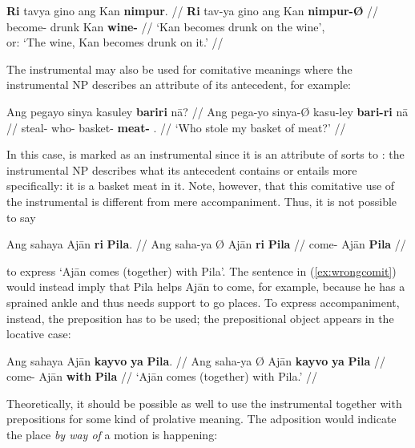 \a\begingl
	\gla \textbf{Ri} tavya gino ang Kan \textbf{nimpur}. //
	\glb \textbf{Ri} tav-ya gino ang Kan \textbf{nimpur-Ø} //
	\glc \textbf{\InsT{}} become-\TsgM{} drunk \Aarg{} Kan 
		\textbf{wine-\Top{}} //
	\glft `Kan becomes drunk on the wine', \\
		or: `The wine, Kan becomes drunk on it.' //
\endgl

\xe

The instrumental may also be used for comitative meanings where the 
instrumental NP describes an attribute of its antecedent, for example:

\ex\begingl
	\gla Ang pegayo sinya kasuley \textbf{bariri} nā? //
	\glb Ang pega-yo sinya-Ø kasu-ley \textbf{bari-ri} nā //
	\glc \AgtT{} steal-\TsgN{} who-\Top{} basket-\PargI{} 
		\textbf{meat-\Ins{}} \Fsg{}.\Gen{} //
	\glft `Who stole my basket of meat?' //
\endgl\xe

In this case,  is marked as an instrumental since it is an 
attribute of sorts to : the instrumental NP describes what its 
antecedent contains or entails more specifically: it is a basket  meat 
in it. Note, however, that this comitative use of the instrumental is different 
from mere accompaniment. Thus, it is not possible to say

\ex\label{ex:wrongcomit}\ljudge* \begingl
	\gla Ang sahaya {} Ajān \textbf{ri} \textbf{Pila}. //
	\glb Ang saha-ya Ø Ajān \textbf{ri} \textbf{Pila} //
	\glc \AgtT{} come-\TsgM{} \Top{} Ajān \textbf{\Ins{}} \textbf{Pila} //
\endgl\xe

\noindent to express `Ajān comes (together) with Pila'. The sentence in 
(\ref{ex:wrongcomit}) would instead imply that Pila helps Ajān to come, for 
example, because he has a sprained ankle and thus needs support to go places. 
To express accompaniment, instead, the preposition  has to be used; the prepositional object appears in the locative 
case:

\ex\begingl
	\gla Ang sahaya {} Ajān \textbf{kayvo} \textbf{ya} \textbf{Pila}. //
	\glb Ang saha-ya Ø Ajān \textbf{kayvo} \textbf{ya} \textbf{Pila} //
	\glc \AgtT{} come-\TsgM{} \Top{} Ajān \textbf{with} \textbf{\Loc{}} 
		\textbf{Pila} //
	\glft `Ajān comes (together) with Pila.' //
\endgl\xe

Theoretically, it should be possible as well to use the instrumental together 
with prepositions for some kind of prolative meaning. The adposition would 
indicate the place \emph{by way of} a motion is happening:

